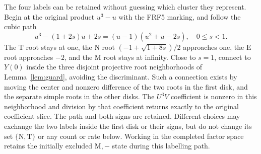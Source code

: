 \documentclass[11pt]{article}
\begin{document}
The four labels can be retained without guessing which cluster they
represent. Begin at the original product $u^3-u$ with the FRF5 marking,
and follow the cubic path
\[
 u^3-(1+2s)u+2s=(u-1)(u^2+u-2s),\quad 0\le s<1.\tag{FRF33}
\]
The $\mathrm T$ root stays at one, the $\mathrm N$ root
$(-1+\sqrt{1+8s})/2$ approaches one, the $\mathrm E$ root approaches
$-2$, and the $\mathrm M$ root stays at infinity. Close to $s=1$,
connect to $Y(0)$ inside the three disjoint projective root neighborhoods
of Lemma~\ref{lem:guard}, avoiding the discriminant. Such a connection
exists by moving the center and nonzero difference of the two roots in
the first disk, and the separate simple roots in the other disks. The
$U^3V$ coefficient is nonzero in this neighborhood and division by that
coefficient returns exactly to the original coefficient slice. The path
and both signs are retained. Different choices may exchange the two
labels inside the first disk or their signs, but do not change its set
$\{\mathrm N,\mathrm T\}$ or any count or rate below. Working in the
completed factor space retains the initially excluded $\mathrm M,-$
state during this labelling path.
\end{document}
